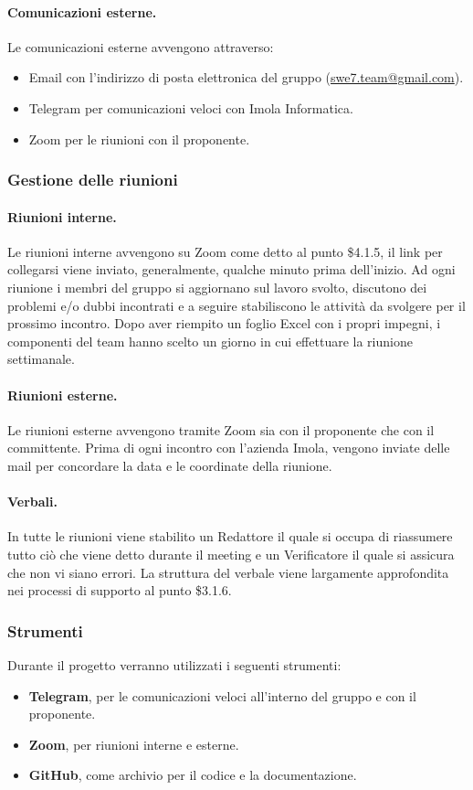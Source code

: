 \paragraph{Comunicazioni esterne.}
Le comunicazioni esterne avvengono attraverso:
\begin{itemize}
    \item Email con l'indirizzo di posta elettronica del gruppo (\href{mailto:swe7.team@gmail.com}{swe7.team@gmail.com}).
    \item Telegram per comunicazioni veloci con Imola Informatica.
    \item Zoom per le riunioni con il proponente.
\end{itemize}

\subsubsection{Gestione delle riunioni}
\paragraph{Riunioni interne.}
Le riunioni interne avvengono su Zoom come detto al punto \$4.1.5, il link per collegarsi viene inviato, generalmente, 
qualche minuto prima dell'inizio. Ad ogni riunione i membri del gruppo si aggiornano sul lavoro svolto, discutono dei problemi e/o dubbi incontrati 
e a seguire stabiliscono le attività da svolgere per il prossimo incontro. Dopo aver riempito un foglio Excel con i propri impegni, 
i componenti del team hanno scelto un giorno in cui effettuare la riunione settimanale.

\paragraph{Riunioni esterne.}
Le riunioni esterne avvengono tramite Zoom sia con il proponente che con il committente. Prima di ogni incontro con 
l'azienda Imola, vengono inviate delle mail per concordare la data e le coordinate della riunione. 

\paragraph{Verbali.}
In tutte le riunioni viene stabilito un Redattore il quale si occupa di riassumere tutto ciò che
viene detto durante il meeting e un Verificatore il quale si assicura che non vi siano errori. La struttura del verbale viene 
largamente approfondita nei processi di supporto al punto \$3.1.6.

\subsubsection{Strumenti}
Durante il progetto verranno utilizzati i seguenti strumenti:
\begin{itemize}
    \item \textbf{Telegram}, per le comunicazioni veloci all'interno del gruppo e con il proponente.
    \item \textbf{Zoom}, per riunioni interne e esterne.
    \item \textbf{GitHub}, come archivio per il codice e la documentazione.
\end{itemize}
